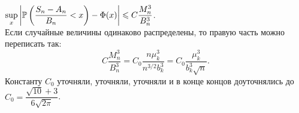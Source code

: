 \documentclass[../TV&MS.tex]{subfiles}
\begin{document}
\begin{Th}
    $\sup\limits_{x} \left| \mathbb{P} \left( \dfrac{S_n - A_n}{B_n} < x \right) - \Phi(x) \right| \leqslant C\dfrac{M_n^3}{B_n^3}$. \\
    Если случайные величины одинаково распределены, то правую часть можно переписать так:
    \[
    C \frac{M_n^3}{B_n^3} = C_0 \frac{n \mu_k^3}{n^{3/2} b_k^3} =
    C_0 \frac{\mu_k^3}{b_k^3 \sqrt{n}}
    .\] 
    Константу $C_0$ уточняли, уточняли, уточняли и в конце концов доуточнялись до $C_0 = \dfrac{\sqrt{10} + 3}{6 \sqrt{2 \pi}}$.
\end{Th}

\newpage
\end{document}
